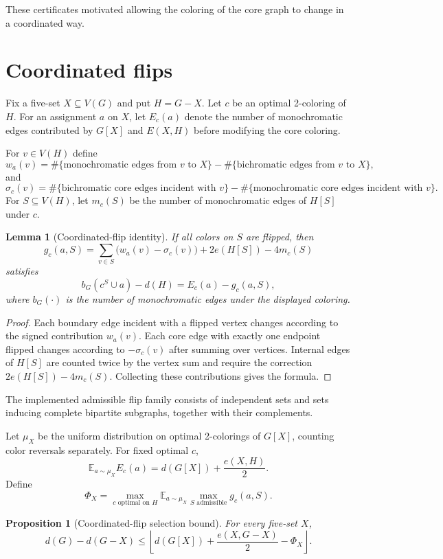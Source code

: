 \documentclass[11pt]{article}
\newtheorem{proposition}{Proposition}
\newtheorem{lemma}{Lemma}
\newcommand{\dd}{d}
\newcommand{\E}{\mathbb{E}}
\begin{document}
These certificates motivated allowing the coloring of the core graph to
change in a coordinated way.

\section{Coordinated flips}
\label{sec:flips}

Fix a five-set $X\subseteq V(G)$ and put $H=G-X$.  Let $c$ be an optimal
2-coloring of $H$.  For an assignment $a$ on $X$, let $E_c(a)$ denote the
number of monochromatic edges contributed by $G[X]$ and $E(X,H)$ before
modifying the core coloring.

For $v\in V(H)$ define
\[
w_a(v)=
\#\{\text{monochromatic edges from $v$ to $X$}\}
-
\#\{\text{bichromatic edges from $v$ to $X$}\},
\]
and
\[
\sigma_c(v)=
\#\{\text{bichromatic core edges incident with $v$}\}
-
\#\{\text{monochromatic core edges incident with $v$}\}.
\]
For $S\subseteq V(H)$, let $m_c(S)$ be the number of monochromatic edges
of $H[S]$ under $c$.

\begin{lemma}[Coordinated-flip identity]
If all colors on $S$ are flipped, then
\[
g_c(a,S)=
\sum_{v\in S}\bigl(w_a(v)-\sigma_c(v)\bigr)
+2e(H[S])-4m_c(S)
\]
satisfies
\[
 b_G(c^S\cup a)-\dd(H)=E_c(a)-g_c(a,S),
\]
where $b_G(\cdot)$ is the number of monochromatic edges under the displayed
coloring.
\end{lemma}

\begin{proof}
Each boundary edge incident with a flipped vertex changes according to the
signed contribution $w_a(v)$.  Each core edge with exactly one endpoint
flipped changes according to $-\sigma_c(v)$ after summing over vertices.
Internal edges of $H[S]$ are counted twice by the vertex sum and require
the correction $2e(H[S])-4m_c(S)$.  Collecting these contributions gives
the formula.
\end{proof}

The implemented admissible flip family consists of independent sets and
sets inducing complete bipartite subgraphs, together with their
complements.

Let $\mu_X$ be the uniform distribution on optimal 2-colorings of $G[X]$,
counting color reversals separately.  For fixed optimal $c$,
\[
\E_{a\sim\mu_X}E_c(a)
=\dd(G[X])+\frac{e(X,H)}2.
\]
Define
\[
\Phi_X=
\max_{c\text{ optimal on }H}
\E_{a\sim\mu_X}\max_{S\text{ admissible}}g_c(a,S).
\]

\begin{proposition}[Coordinated-flip selection bound]
For every five-set $X$,
\[
\dd(G)-\dd(G-X)
\le
\left\lfloor
\dd(G[X])+\frac{e(X,G-X)}2-\Phi_X
\right\rfloor.
\]
\end{proposition}
\end{document}
